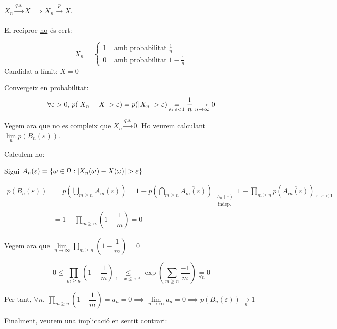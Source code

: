 \begin{prop}[(IV)]
  $X_n \overset{q.s.}{\to} X \implies X_n \overset{p}{\to} X$. \\\\
  
  El recíproc \underline{no} és cert:
  
  \[
    X_n = \begin{cases}
      1 &\text{ amb probabilitat } \frac{1}{n}\\
      0 &\text{ amb probabilitat } 1 - \frac{1}{n}
    \end{cases}
  \]
  Candidat a límit: $X=0$
  
  Convergeix en probabilitat: 
  $$\forall \varepsilon > 0, \, p(\left\vert X_n - X \right\vert > \varepsilon) = p(\left\vert X_n \right\vert>\varepsilon) \underset{\text{si } \varepsilon < 1}{=} \frac{1}{n} \underset{n \to \infty}{\longrightarrow} 0$$
  
  Vegem ara que no es compleix que $X_n \overset{q.s.}{\to} 0$. Ho veurem calculant $\lim\limits_{n} p(B_n(\varepsilon))$.
  
  Calculem-ho:
  
  Sigui $A_n(\varepsilon) = \left\{\omega \in \Omega : \left\vert X_n(\omega) - X(\omega) \right\vert > \varepsilon\right\}$
  
    \begin{align*}
        p(B_n(\varepsilon)) &= p\left(\bigcup_{m\geq n}A_m(\varepsilon)\right) = 1 - p\left(\bigcap_{m\geq n}\overline{A_m(\varepsilon)}\right) \underset{\substack{A_n(\varepsilon) \\ \text{ indep.}}}{=} 1 - \prod_{m\geq n}{p\left(\overline{A_m(\varepsilon)} \right)} \underset{\text{si } \varepsilon < 1}{=}\\
        &= 1 - \prod_{m\geq n}\left(1-\dfrac{1}{m} \right) = 0
    \end{align*}
    
    Vegem ara que $\lim\limits_{n\to \infty}\displaystyle\prod_{m\geq n}\left(1-\dfrac{1}{m} \right) = 0$
    
    \[
      0 \leq \prod_{m\geq n}\left(1-\dfrac{1}{m} \right) \underset{1-x\leq e^{-x}}{\leq} \exp\left(\sum_{m\geq n}\frac{-1}{m}\right) \underset{\forall n}{=} 0
    \]
    
    Per tant, $\forall n$, $\displaystyle\prod_{m\geq n}\left(1-\dfrac{1}{m} \right) = a_n = 0 \implies \lim\limits_{n\to \infty} a_n = 0 \implies p(B_n(\varepsilon)) \underset{n}{\longrightarrow} 1$
\end{prop}

Finalment, veurem una implicació en sentit contrari:

